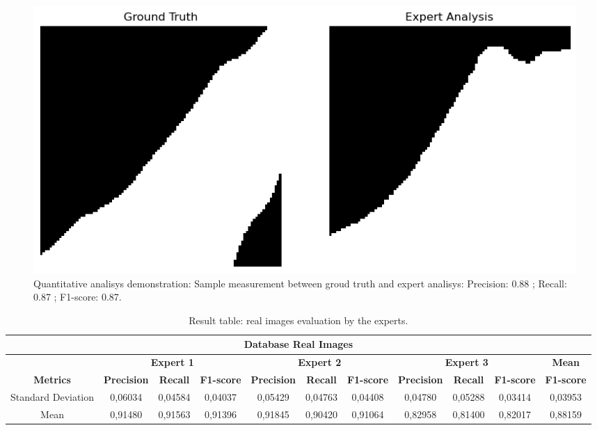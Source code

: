 \documentclass{ieeeaccess}
\begin{document}
\begin{figure}
    \centering
    \includegraphics[width=1\linewidth]{images/expert.png}
    \caption{Quantitative analisys demonstration: Sample measurement between groud truth and expert analisys: Precision: 0.88 ; Recall: 0.87 ; F1-score: 0.87.}
    \label{fig:expert2}
\end{figure}

\begin{table}[h!]
\centering
\caption{Result table: real images evaluation by the experts.}
\label{tab:real_images_evaluation}
\begin{tabular}{|c|c|c|c|c|c|c|c|c|c|c|}
\hline
\multicolumn{11}{|c|}{\textbf{Database Real Images}} \\
\hline
~ & \multicolumn{3}{c|}{\textbf{Expert 1}} & \multicolumn{3}{c|}{\textbf{Expert 2}} & \multicolumn{3}{c|}{\textbf{Expert 3}} & \textbf{Mean} \\
\cline{2-11}
\textbf{Metrics} & \textbf{Precision} & \textbf{Recall} & \textbf{F1-score} & \textbf{Precision} & \textbf{Recall} & \textbf{F1-score} & \textbf{Precision} & \textbf{Recall} & \textbf{F1-score} & \textbf{F1-score} \\
\hline
Standard Deviation & 0,06034 & 0,04584 & 0,04037 & 0,05429 & 0,04763 & 0,04408 & 0,04780 & 0,05288 & 0,03414 & 0,03953 \\
\hline
Mean & 0,91480 & 0,91563 & 0,91396 & 0,91845 & 0,90420 & 0,91064 & 0,82958 & 0,81400 & 0,82017 & 0,88159 \\
\hline
\end{tabular}
\end{table}
\end{document}
